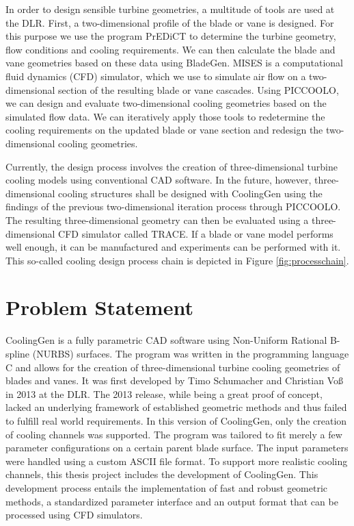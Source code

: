\documentclass[a4paper, 11pt]{report}
\theoremstyle{definition}
\begin{document}
		In order to design sensible turbine geometries, a multitude of tools are used at the DLR. First, a two-dimensional profile of the blade or vane is designed. For this purpose we use the program PrEDiCT to determine the turbine geometry, flow conditions and cooling requirements. We can then calculate the blade and vane geometries based on these data using BladeGen. MISES is a computational fluid dynamics (CFD) simulator, which we use to simulate air flow on a two-dimensional section of the resulting blade or vane cascades. Using PICCOOLO, we can design and evaluate two-dimensional cooling geometries based on the simulated flow data. We can iteratively apply those tools to redetermine the cooling requirements on the updated blade or vane section and redesign the two-dimensional cooling geometries.

		Currently, the design process involves the creation of three-dimensional turbine cooling models using conventional CAD software. In the future, however, three-dimensional cooling structures shall be designed with CoolingGen using the findings of the previous two-dimensional iteration process through PICCOOLO. The resulting three-dimensional geometry can then be evaluated using a three-dimensional CFD simulator called TRACE. If a blade or vane model performs well enough, it can be manufactured and experiments can be performed with it. This so-called cooling design process chain is depicted in Figure \ref{fig:processchain}.

	\section{Problem Statement}
		CoolingGen is a fully parametric CAD software using Non-Uniform Rational B-spline (NURBS) surfaces. The program was written in the programming language C and allows for the creation of three-dimensional turbine cooling geometries of blades and vanes. It was first developed by Timo Schumacher and Christian Voß in 2013 at the DLR. The 2013 release, while being a great proof of concept, lacked an underlying framework of established geometric methods and thus failed to fulfill real world requirements. In this version of CoolingGen, only the creation of cooling channels was supported. The program was tailored to fit merely a few parameter configurations on a certain parent blade surface. The input parameters were handled using a custom ASCII file format. To support more realistic cooling channels, this thesis project includes the development of CoolingGen. This development process entails the implementation of fast and robust geometric methods, a standardized parameter interface and an output format that can be processed using CFD simulators.
\end{document}
